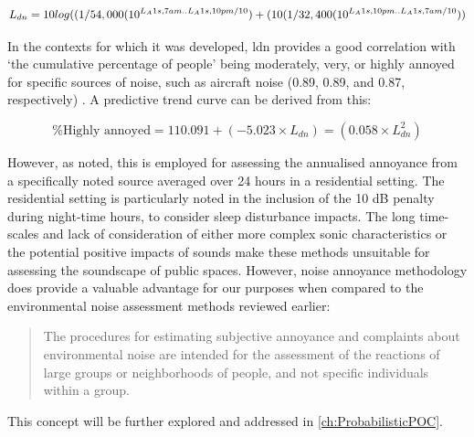 \begin{dmath}
  L_{dn} = 10 log((1/54,000 (10^{L_{A}1s,7am..L_A1s,10pm/10})\\ + (10(1/32,400 (10^{L_A1s,10pm..L_A1s,7am/10}))
\end{dmath}


In the contexts for which it was developed, \gls{ldn} provides a good correlation with `the cumulative percentage of people' being moderately, very, or highly annoyed for specific sources of noise, such as aircraft noise (0.89, 0.89, and 0.87, respectively) \citep{Kryter1994}. A predictive trend curve can be derived from this:

\begin{equation}
\% \text{Highly annoyed} = 110.091 + (-5.023 \times L_{dn}) = (0.058 \times L_{dn}^2)
\end{equation}

However, as noted, this is employed for assessing the annualised annoyance from a specifically noted source averaged over 24 hours in a residential setting. The residential setting is particularly noted in the inclusion of the 10 dB penalty during night-time hours, to consider sleep disturbance impacts. The long time-scales and lack of consideration of either more complex sonic characteristics or the potential positive impacts of sounds make these methods unsuitable for assessing the soundscape of public spaces. However, noise annoyance methodology does provide a valuable advantage for our purposes when compared to the environmental noise assessment methods reviewed earlier:

\begin{quote}
  The procedures for estimating subjective annoyance and complaints about environmental noise are intended for the assessment of the reactions of large groups or neighborhoods of people, and not specific individuals within a group.
  \begin{flushright}
    \citet[pg. 571]{Kryter1994}
  \end{flushright}
\end{quote}

This concept will be further explored and addressed in \cref{ch:ProbabilisticPOC}.


